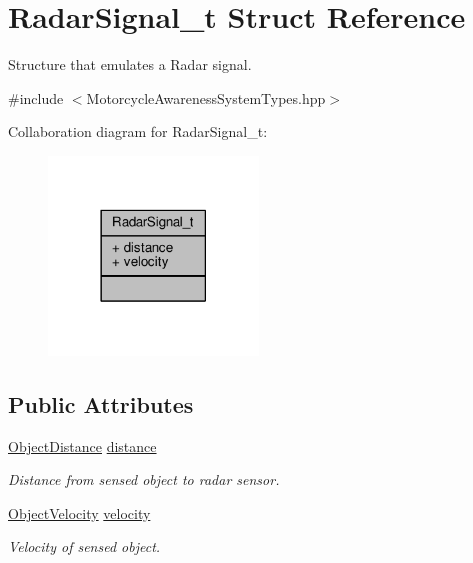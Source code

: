 \hypertarget{structRadarSignal__t}{\section{Radar\-Signal\-\_\-t Struct Reference}
\label{structRadarSignal__t}
}


Structure that emulates a Radar signal.  




{\ttfamily \#include $<$Motorcycle\-Awareness\-System\-Types.\-hpp$>$}



Collaboration diagram for Radar\-Signal\-\_\-t\-:\nopagebreak
\begin{figure}[H]
\begin{center}
\leavevmode
\includegraphics[width=158pt]{structRadarSignal__t__coll__graph}
\end{center}
\end{figure}
\subsection*{Public Attributes}
\begin{DoxyCompactItemize}
\item 
\hyperlink{MotorcycleAwarenessSystemTypes_8hpp_a6d34a01b51bff9b1cc17900d711a9b76}{Object\-Distance} \hyperlink{structRadarSignal__t_a79f6d1be92d835eba8fe0646c37d1053}{distance}
\begin{DoxyCompactList}\small\item\em Distance from sensed object to radar sensor. \end{DoxyCompactList}\item 
\hyperlink{MotorcycleAwarenessSystemTypes_8hpp_ae069b9d80ba548bc07502c05a1efaac0}{Object\-Velocity} \hyperlink{structRadarSignal__t_ac907ac4305b7d6c172661e95b030359d}{velocity}
\begin{DoxyCompactList}\small\item\em Velocity of sensed object. \end{DoxyCompactList}\end{DoxyCompactItemize}


